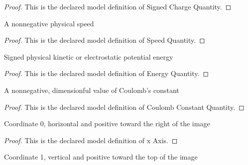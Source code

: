 \begin{proof}
  This is the declared model definition of Signed Charge Quantity.
\end{proof}
\begin{definition}
  \label{def:physics:phyx-mini-0853:phyxminiproblems-problemphyxmini0853-speedquantity}
  A nonnegative physical speed
\end{definition}
\begin{proof}
  This is the declared model definition of Speed Quantity.
\end{proof}
\begin{definition}
  \label{def:physics:phyx-mini-0853:phyxminiproblems-problemphyxmini0853-energyquantity}
  Signed physical kinetic or electrostatic potential energy
\end{definition}
\begin{proof}
  This is the declared model definition of Energy Quantity.
\end{proof}
\begin{definition}
  \label{def:physics:phyx-mini-0853:phyxminiproblems-problemphyxmini0853-coulombconstantquantity}
  A nonnegative, dimensionful value of Coulomb's constant
\end{definition}
\begin{proof}
  This is the declared model definition of Coulomb Constant Quantity.
\end{proof}
\begin{definition}[x Axis]
  \label{def:physics:phyx-mini-0853:phyxminiproblems-problemphyxmini0853-xaxis}
  Coordinate 0, horizontal and positive toward the right of the image
\end{definition}
\begin{proof}
  This is the declared model definition of x Axis.
\end{proof}
\begin{definition}[y Axis]
  \label{def:physics:phyx-mini-0853:phyxminiproblems-problemphyxmini0853-yaxis}
  Coordinate 1, vertical and positive toward the top of the image
\end{definition}

